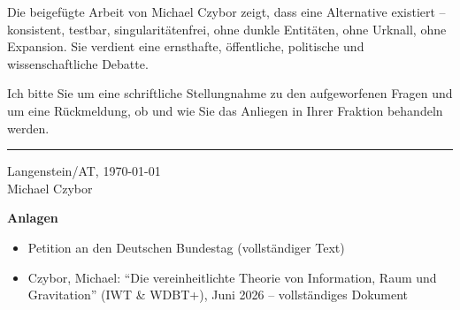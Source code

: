 \documentclass[11pt,a4paper]{letter}
\begin{document}
\begin{letter}
Die beigefügte Arbeit von Michael Czybor zeigt, dass eine Alternative existiert – konsistent, testbar, singularitätenfrei, ohne dunkle Entitäten, ohne Urknall, ohne Expansion. Sie verdient eine ernsthafte, öffentliche, politische und wissenschaftliche Debatte.

Ich bitte Sie um eine schriftliche Stellungnahme zu den aufgeworfenen Fragen und um eine Rückmeldung, ob und wie Sie das Anliegen in Ihrer Fraktion behandeln werden.

\vspace{1cm}

\begin{flushleft}
    \rule{6cm}{0.4pt}
    
    \vspace{0.2cm}
    
    Langenstein/AT, \today\\Michael Czybor
\end{flushleft}

\noindent
\textbf{Anlagen}

\begin{itemize}
    \item Petition an den Deutschen Bundestag (vollständiger Text)
    \item Czybor, Michael: \enquote{Die vereinheitlichte Theorie von Information, Raum und Gravitation} (IWT \& WDBT+), Juni 2026 – vollständiges Dokument
\end{itemize}

\end{letter}
\end{document}
